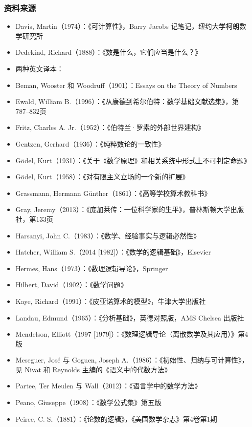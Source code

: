 \subsubsection{资料来源}
\begin{itemize}
\item Davis, Martin（1974）：《可计算性》，Barry Jacobs 记笔记，纽约大学柯朗数学研究所
\item Dedekind, Richard（1888）：《数是什么，它们应当是什么？》
\item 两种英文译本：
\item Beman, Wooster 和 Woodruff（1901）：Essays on the Theory of Numbers
\item Ewald, William B.（1996）：《从康德到希尔伯特：数学基础文献选集》，第787–832页
\item Fritz, Charles A. Jr.（1952）：《伯特兰·罗素的外部世界建构》
\item Gentzen, Gerhard（1936）：《纯粹数论的一致性》
\item Gödel, Kurt（1931）：《关于《数学原理》和相关系统中形式上不可判定命题》
\item Gödel, Kurt（1958）：《对有限主义立场的一个新的扩展》
\item Grassmann, Hermann Günther（1861）：《高等学校算术教科书》
\item Gray, Jeremy（2013）：《庞加莱传：一位科学家的生平》，普林斯顿大学出版社，第133页
\item Harsanyi, John C.（1983）：《数学、经验事实与逻辑必然性》
\item Hatcher, William S.（2014 [1982]）：《数学的逻辑基础》，Elsevier
\item Hermes, Hans（1973）：《数理逻辑导论》，Springer
\item Hilbert, David（1902）：《数学问题》
\item Kaye, Richard（1991）：《皮亚诺算术的模型》，牛津大学出版社
\item Landau, Edmund（1965）：《分析基础》，英德对照版，AMS Chelsea 出版社
\item Mendelson, Elliott（1997 [1979]）：《数理逻辑导论（离散数学及其应用）》第4版
\item Meseguer, José 与 Goguen, Joseph A.（1986）：《初始性、归纳与可计算性》，见 Nivat 和 Reynolds 主编的《语义中的代数方法》
\item Partee, Ter Meulen 与 Wall（2012）：《语言学中的数学方法》
\item Peano, Giuseppe（1908）：《数学公式集》第五版
\item Peirce, C. S.（1881）：《论数的逻辑》，《美国数学杂志》第4卷第1期

\end{itemize}
